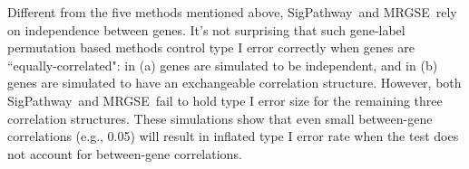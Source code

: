 \documentclass[a4,center,fleqn]{NAR}
\newcommand{\aaCase}{a}
\newcommand{\aCase}{c}
\newcommand{\cCase}{b}
\newcommand{\eCase}{d}
\newcommand{\fCase}{e}
\newcommand{\gent}{SigPathway}
\newcommand{\gen}{geneSetTest}
\newcommand{\genr}{MRGSE}
\begin{document}
	Different from the five methods mentioned above, \gent~and \genr~rely on independence between
	genes. It's not surprising that such gene-label permutation based methods control type I
	error correctly when genes are ``equally-correlated": in (\aaCase) genes are simulated to be
	independent, and in (\cCase) genes are simulated to have an exchangeable correlation structure.
	However, both \gent~and \genr~fail to hold type I error size for the remaining three correlation
	structures. These simulations show that even small between-gene correlations (e.g., 0.05) will 
	result in inflated type I error rate when the test does not account for between-gene 
	correlations.  

	
	
\end{document}
